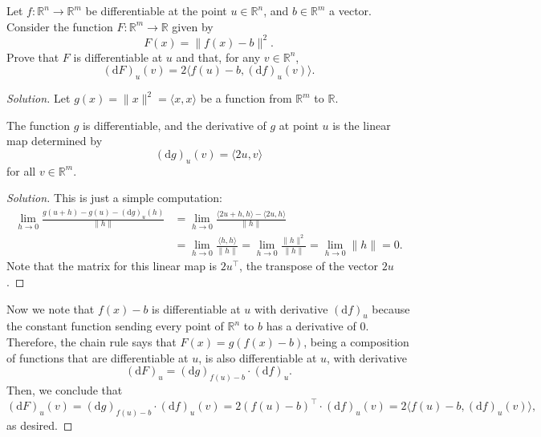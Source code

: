 \documentclass[11pt]{scrartcl}
\providecommand{\RR}{\mathbb R}
\newenvironment{soln}{\begin{proof}[Solution]}{\end{proof}}
\begin{document}
\begin{problem}
	Let $f\colon\RR^n\to\RR^m$ be differentiable at the point $u\in\RR^n$,
	and $b\in\RR^m$ a vector. Consider the function $F\colon\RR^m\to\RR$
	given by
	\[F(x) = \|f(x) - b\|^2.\]
	Prove that $F$ is differentiable at $u$ and that, for any $v\in\RR^n$,
	\[(\mathrm dF)_u(v) = 2\langle f(u) - b, (\mathrm df)_u(v)\rangle.\]
\end{problem}

\begin{soln}
	Let $g(x) = \|x\|^2 = \langle x,x\rangle$ be a function from
	$\RR^m$ to $\RR$.
	\begin{claim}
		The function $g$ is differentiable,
		and the derivative of $g$ at point $u$ is
		the linear map determined by
		\[(\mathrm dg)_u(v) = \langle 2u,v\rangle\]
		for all $v\in\RR^m$.
	\end{claim}
	\begin{soln}
		This is just a simple computation:
		\begin{align*}
			\lim_{h\to 0} \frac{g(u+h)-g(u) - (\mathrm dg)_u(h)}{\|h\|}
			&= \lim_{h\to 0} \frac{\langle 2u+h, h\rangle - \langle 2u,h\rangle}
			{\|h\|}\\
			&= \lim_{h\to 0} \frac{\langle h,h\rangle}{\|h\|}
			= \lim_{h\to 0} \frac{\|h\|^2}{\|h\|}
			= \lim_{h\to 0} \|h\| = 0.
		\end{align*}
		Note that the matrix for this linear map is $2u^\top$, the transpose of
		the vector $2u$.
	\end{soln}
	
	Now we note that $f(x)-b$ is differentiable at $u$
	with derivative $(\mathrm df)_u$ because the constant function
	sending every point of $\RR^n$ to $b$ has a derivative of $0$.
	Therefore, the chain rule says that $F(x) = g(f(x) - b)$,
	being a composition of functions that are differentiable at $u$,
	is also differentiable at $u$, with derivative
	\[(\mathrm dF)_u = (\mathrm dg)_{f(u) - b}\cdot(\mathrm df)_u.\]
	Then, we conclude that
	\[(\mathrm dF)_u(v) = (\mathrm dg)_{f(u) - b}\cdot (\mathrm df)_u(v)
	= 2(f(u) - b)^\top \cdot(\mathrm df)_{u}(v)
	= 2\langle f(u) - b, (\mathrm df)_u(v)\rangle,\]
	as desired.
\end{soln}
\end{document}
